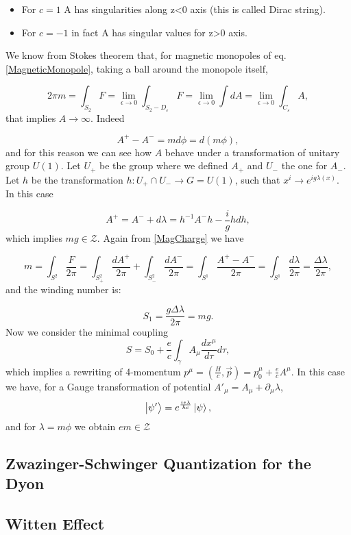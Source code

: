 \documentclass[main.tex]{subfiles}
\begin{document}
\begin{itemize}
\item For $c=1$ A has singularities along z<0 axis (this is called Dirac string).
\item For $c=-1$ in fact A has singular values for z>0 axis.
\end{itemize}
We know from Stokes theorem that, for magnetic monopoles of eq. \eqref{MagneticMonopole}, taking a ball around the monopole itself,

\begin{equation}\label{MagCharge}
2\pi m=\int_{S_2} F=\lim_{\epsilon\to 0}\int_{S_2-D_{\varepsilon}}F=\lim_{\epsilon\to 0}\int dA=\lim_{\epsilon\to 0}\int_{C_{\varepsilon}} A,
\end{equation}
that implies $A\to\infty$. Indeed

\begin{equation}
A^+-A^-=md\phi=d(m\phi),
\end{equation}
and for this reason we can see how $A$ behave under a transformation of unitary group $U(1)$. Let $U_+$ be the group where we defined $A_+$ and $U_-$ the one for $A_-$.
Let $h$ be the transformation $h:U_+\cap U_- \to G=U(1)$, such that $x^i\to e^{ig\lambda(x)}$. In this case

\begin{equation}
A^+=A^-+d\lambda=h^{-1}A^-h-\frac{i}{g}h dh,
\end{equation}
which implies $mg\in \mathcal{Z}$. Again from \eqref{MagCharge} we have

\begin{equation}
m=\int_{S^2}\frac{F}{2\pi}=\int_{S^2_+}\frac{dA^+}{2\pi}+\int_{S^2_-}\frac{dA^-}{2\pi}=\int_{S^1}\frac{A^+-A^-}{2\pi}=\int_{S^1}\frac{d\lambda}{2\pi}=\frac{\Delta\lambda}{2\pi},
\end{equation}
and the winding number is:

\begin{equation}
S_1=\frac{g\Delta\lambda}{2\pi}=mg.
\end{equation}
Now we consider the minimal coupling
\begin{equation}
S=S_0+\frac{e}{c}\int_{\gamma}A_{\mu}\frac{dx^{\mu}}{d\tau}d\tau,
\end{equation}
which implies a rewriting of 4-momentum $p^{\mu}=\left(\frac{H}{c},\vec p\right)=p_0^{\mu}+\frac{e}{c}A^{\mu}$.
In this case we have, for a Gauge transformation of potential $A'_{\mu}=A_{\mu}+\partial_{\mu}\lambda$,
\begin{equation}
\ket{\psi'}=e^{\frac{ie\lambda}{\hbar c}}\ket{\psi},
\end{equation}
and for $\lambda=m\phi$ we obtain $em\in \mathcal{Z}$

\subsection{Zwazinger-Schwinger Quantization for the Dyon}
\subsection{Witten Effect}
\end{document}
